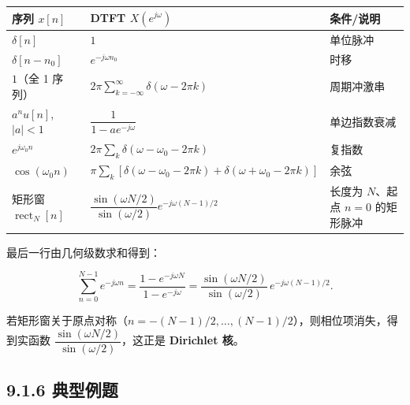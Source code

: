 {\def\LTcaptype{none} %
\begin{longtable}[]{@{}
  >{\raggedright\arraybackslash}p{}
  >{\raggedright\arraybackslash}p{}
  >{\raggedright\arraybackslash}p{}@{}}
\toprule\noalign{}
\begin{minipage}[b]{\linewidth}\raggedright
序列 \(x[n]\)
\end{minipage} & \begin{minipage}[b]{\linewidth}\raggedright
DTFT \(X(e^{j\omega})\)
\end{minipage} & \begin{minipage}[b]{\linewidth}\raggedright
条件/说明
\end{minipage} \\
\midrule\noalign{}
\endhead
\bottomrule\noalign{}
\endlastfoot
\(\delta[n]\) & \(1\) & 单位脉冲 \\
\(\delta[n-n_0]\) & \(e^{-j\omega n_0}\) & 时移 \\
\(1\)（全 1 序列） &
\(2\pi\sum_{k=-\infty}^{\infty}\delta(\omega-2\pi k)\) & 周期冲激串 \\
\(a^n u[n]\), \(|a|<1\) & \(\dfrac{1}{1-a e^{-j\omega}}\) &
单边指数衰减 \\
\(e^{j\omega_0 n}\) & \(2\pi\sum_{k}\delta(\omega-\omega_0-2\pi k)\) &
复指数 \\
\(\cos(\omega_0 n)\) &
\(\pi\sum_k[\delta(\omega-\omega_0-2\pi k)+\delta(\omega+\omega_0-2\pi k)]\)
& 余弦 \\
矩形窗 \(\operatorname{rect}_N[n]\) &
\(\dfrac{\sin(\omega N/2)}{\sin(\omega/2)}e^{-j\omega(N-1)/2}\) & 长度为
\(N\)、起点 \(n=0\) 的矩形脉冲 \\
\end{longtable}
}

最后一行由几何级数求和得到：

\[
\sum_{n=0}^{N-1} e^{-j\omega n}
= \frac{1-e^{-j\omega N}}{1-e^{-j\omega}}
= \frac{\sin(\omega N/2)}{\sin(\omega/2)}\,e^{-j\omega(N-1)/2}.
\]

若矩形窗关于原点对称（\(n=-(N-1)/2,\ldots,(N-1)/2\)），则相位项消失，得到实函数
\(\dfrac{\sin(\omega N/2)}{\sin(\omega/2)}\)，这正是 \textbf{Dirichlet
核}。

\subsection{9.1.6 典型例题}\label{ux5178ux578bux4f8bux9898-7}

